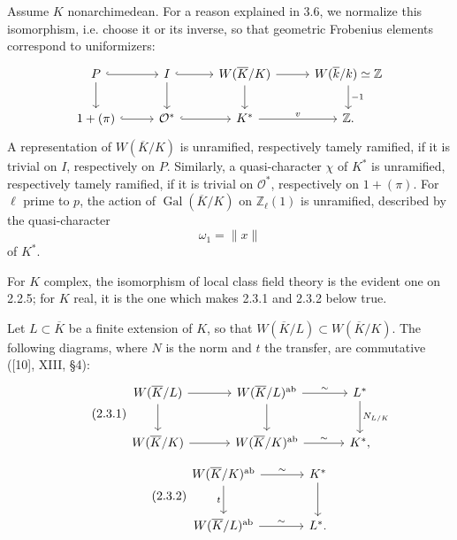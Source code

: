 \documentclass[10pt]{article}
\newcommand{\Z}{\mathbb Z}
\newcommand{\Gal}{\operatorname{Gal}}
\providecommand{\ab}{\mathrm{ab}}
\providecommand{\ab}{\mathrm{ab}}
\begin{document}
Assume \(K\) nonarchimedean. For a reason explained in 3.6, we normalize this isomorphism, i.e. choose it or its inverse, so that geometric Frobenius elements correspond to uniformizers:
\[
\begin{tikzcd}[column sep=2.7em,row sep=1.9em]
P \arrow[r,hook] \arrow[d] & I \arrow[r,hook] \arrow[d] &
W(\overline K/K) \arrow[r] \arrow[d] &
W(\overline k/k)\simeq\Z \arrow[d,"{-1}"]\\
1+(\pi) \arrow[r,hook] & \mathcal O^* \arrow[r,hook] &
K^* \arrow[r,"v"] & \Z .
\end{tikzcd}
\]
A representation of \(W(\overline K/K)\) is unramified, respectively tamely ramified, if it is trivial on \(I\), respectively on \(P\). Similarly, a quasi-character \(\chi\) of \(K^*\) is unramified, respectively tamely ramified, if it is trivial on \(\mathcal O^*\), respectively on \(1+(\pi)\). For \(\ell\) prime to \(p\), the action of \(\Gal(\overline K/K)\) on \(\Z_\ell(1)\) is unramified, described by the quasi-character
\[
\omega_1=\|x\|
\]
of \(K^*\).

For \(K\) complex, the isomorphism of local class field theory is the evident one on 2.2.5; for \(K\) real, it is the one which makes 2.3.1 and 2.3.2 below true.

Let \(L\subset\overline K\) be a finite extension of \(K\), so that \(W(\overline K/L)\subset W(\overline K/K)\). The following diagrams, where \(N\) is the norm and \(t\) the transfer, are commutative ([10], XIII, §4):
\[
\tag{2.3.1}
\begin{tikzcd}[column sep=3.3em,row sep=2.2em]
W(\overline K/L) \arrow[r] \arrow[d] &
W(\overline K/L)^{\ab} \arrow[r,"\sim"] \arrow[d] &
L^* \arrow[d,"N_{L/K}"]\\
W(\overline K/K) \arrow[r] &
W(\overline K/K)^{\ab} \arrow[r,"\sim"] &
K^* ,
\end{tikzcd}
\]
\[
\tag{2.3.2}
\begin{tikzcd}[column sep=3.5em,row sep=2.3em]
W(\overline K/K)^{\ab} \arrow[r,"\sim"] \arrow[d,"t"'] &
K^* \arrow[d]\\
W(\overline K/L)^{\ab} \arrow[r,"\sim"] &
L^* .
\end{tikzcd}
\]
\end{document}
